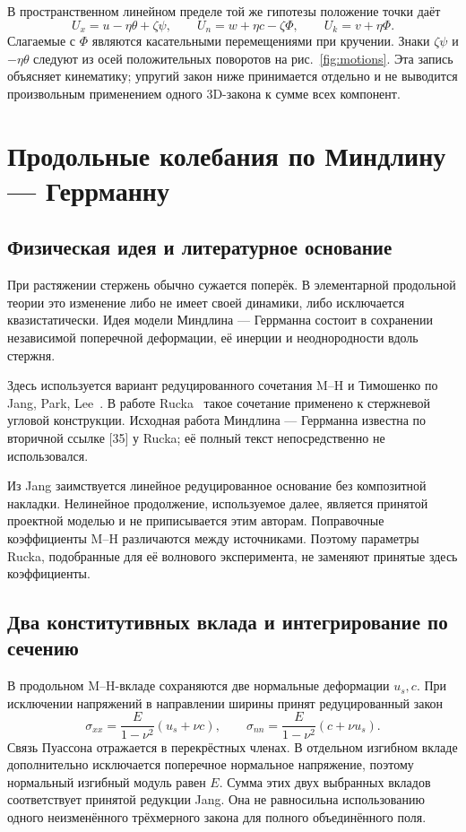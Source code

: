 \documentclass[11pt,a4paper]{article}
\begin{document}
В пространственном линейном пределе той же гипотезы положение точки даёт
\[
U_x=u-\eta\theta+\zeta\psi,\qquad
U_n=w+\eta c-\zeta\Phi,\qquad
U_k=v+\eta\Phi.
\]
Слагаемые с $\Phi$ являются касательными перемещениями при кручении. Знаки $\zeta\psi$ и $-\eta\theta$ следуют из осей положительных поворотов на рис.~\ref{fig:motions}. Эта запись объясняет кинематику; упругий закон ниже принимается отдельно и не выводится произвольным применением одного 3D-закона к сумме всех компонент.

\section{Продольные колебания по Миндлину --- Геррманну}
\subsection{Физическая идея и литературное основание}
При растяжении стержень обычно сужается поперёк. В элементарной продольной теории это изменение либо не имеет своей динамики, либо исключается квазистатически. Идея модели Миндлина --- Геррманна состоит в сохранении независимой поперечной деформации, её инерции и неоднородности вдоль стержня.

Здесь используется вариант редуцированного сочетания M--H и Тимошенко по Jang, Park, Lee~\cite{jang}. В работе Rucka~\cite{rucka} такое сочетание применено к стержневой угловой конструкции. Исходная работа Миндлина --- Геррманна известна по вторичной ссылке [35] у Rucka; её полный текст непосредственно не использовался.

Из Jang заимствуется линейное редуцированное основание без композитной накладки. Нелинейное продолжение, используемое далее, является принятой проектной моделью и не приписывается этим авторам. Поправочные коэффициенты M--H различаются между источниками. Поэтому параметры Rucka, подобранные для её волнового эксперимента, не заменяют принятые здесь коэффициенты.

\subsection{Два конститутивных вклада и интегрирование по сечению}
В продольном M--H-вкладе сохраняются две нормальные деформации $u_s,c$. При исключении напряжений в направлении ширины принят редуцированный закон
\[
\sigma_{xx}=\frac{E}{1-\nu^2}(u_s+\nu c),\qquad
\sigma_{nn}=\frac{E}{1-\nu^2}(c+\nu u_s).
\]
Связь Пуассона отражается в перекрёстных членах. В отдельном изгибном вкладе дополнительно исключается поперечное нормальное напряжение, поэтому нормальный изгибный модуль равен $E$. Сумма этих двух выбранных вкладов соответствует принятой редукции Jang. Она не равносильна использованию одного неизменённого трёхмерного закона для полного объединённого поля.
\end{document}
